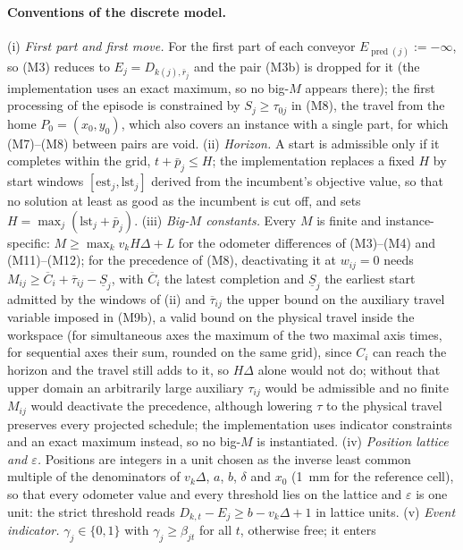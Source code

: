 \documentclass[11pt,a4paper]{article}
\theoremstyle{plain}
\theoremstyle{definition}
\theoremstyle{remark}
\newcommand{\pred}{\operatorname{pred}}
\begin{document}
\paragraph{Conventions of the discrete model.} (i) \emph{First part and first move.} For
the first part of each conveyor $E_{\pred(j)}:=-\infty$, so (M3) reduces to
$E_j=D_{k(j),\bar r_j}$ and the pair (M3b) is dropped for it (the implementation uses an
exact maximum, so no big-$M$ appears there); the first processing of the episode is
constrained by $S_j\ge\tau_{0j}$ in (M8), the travel from the home $P_0=(x_0,y_0)$, which
also covers an instance with a single part, for which (M7)--(M8) between pairs are void.
(ii) \emph{Horizon.} A start is admissible only if it completes within the grid,
$t+\bar p_j\le H$; the implementation replaces a fixed $H$ by start windows
$[\mathrm{est}_j,\mathrm{lst}_j]$ derived from the incumbent's objective value, so that no
solution at least as good as the incumbent is cut off, and sets
$H=\max_j(\mathrm{lst}_j+\bar p_j)$. (iii) \emph{Big-$M$ constants.} Every $M$ is finite
and instance-specific: $M\ge\max_kv_kH\Delta+L$ for the odometer differences of
(M3)--(M4) and (M11)--(M12); for the precedence of (M8), deactivating it at $w_{ij}=0$
needs $M_{ij}\ge\overline C_i+\overline\tau_{ij}-\underline S_j$, with $\overline C_i$ the
latest completion and $\underline S_j$ the earliest start admitted by the windows of
(ii) and $\overline\tau_{ij}$ the upper bound on the auxiliary travel variable imposed in
(M9b), a valid bound on the physical travel inside the workspace (for simultaneous axes
the maximum of the two maximal axis times, for sequential axes their sum, rounded on the
same grid), since $C_i$ can reach the horizon and the travel still adds to it, so
$H\Delta$ alone would not do; without that upper domain an arbitrarily large auxiliary
$\tau_{ij}$ would be admissible and no finite $M_{ij}$ would deactivate the precedence,
although lowering $\tau$ to the physical travel preserves every projected schedule; the implementation uses indicator constraints and an
exact maximum instead, so no big-$M$ is instantiated.
(iv) \emph{Position lattice and $\varepsilon$.} Positions are integers in a unit chosen
as the inverse least common multiple of the denominators of $v_k\Delta$, $a$, $b$,
$\delta$ and $x_0$ (1~mm for the reference cell), so that every odometer value and every
threshold lies on the lattice and $\varepsilon$ is one unit: the strict threshold reads
$D_{k,t}-E_j\ge b-v_k\Delta+1$ in lattice units. (v) \emph{Event indicator.}
$\gamma_j\in\{0,1\}$ with $\gamma_j\ge\beta_{jt}$ for all $t$, otherwise free; it enters
\end{document}
